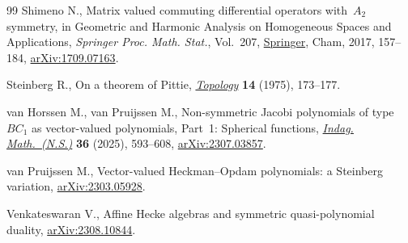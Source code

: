\begin{thebibliography}{99}
Shimeno N., Matrix valued commuting differential operators with~{$A_2$}
 symmetry, in Geometric and {H}armonic {A}nalysis on {H}omogeneous {S}paces
 and {A}pplications, \textit{Springer Proc. Math. Stat.}, Vol.~207,
 \href{https://doi.org/10.1007/978-3-319-65181-1_6}{Springer}, Cham, 2017,
 157--184, \href{http://arxiv.org/abs/1709.07163}{arXiv:1709.07163}.

Steinberg R., On a theorem of {P}ittie,
 \href{https://doi.org/10.1016/0040-9383(75)90025-7}{\textit{Topology}}
 \textbf{14} (1975), 173--177.

van Horssen M., van Pruijssen M., Non-symmetric {J}acobi polynomials of
 type~{$B C_1$} as vector-valued polynomials, {P}art~1: {S}pherical functions,
 \href{https://doi.org/10.1016/j.indag.2024.09.003}{\textit{Indag.
 Math.~(N.S.)}} \textbf{36} (2025), 593--608,
 \href{http://arxiv.org/abs/2307.03857}{arXiv:2307.03857}.

van Pruijssen M., Vector-valued {H}eckman--{O}pdam polynomials: a {S}teinberg
 variation, \href{http://arxiv.org/abs/2303.05928}{arXiv:2303.05928}.

Venkateswaran V., Affine Hecke algebras and symmetric quasi-polynomial duality,
 \href{http://arxiv.org/abs/2308.10844}{arXiv:2308.10844}.

\end{thebibliography}
